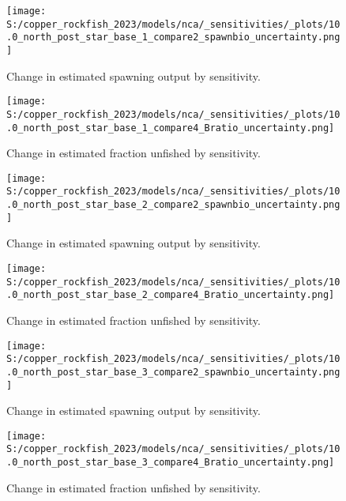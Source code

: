 \documentclass[11pt,
  letterpaper,
]{article}
\begin{document}
\newpage

\begin{figure}
{\centering
\texttt{[image: S:/copper\_rockfish\_2023/models/nca/\_sensitivities/\_plots/10.0\_north\_post\_star\_base\_1\_compare2\_spawnbio\_uncertainty.png]}
}
\caption{Change in estimated spawning output by sensitivity.\label{fig:sens-ssb-1}}
\end{figure}

\newpage

\begin{figure}
{\centering
\texttt{[image: S:/copper\_rockfish\_2023/models/nca/\_sensitivities/\_plots/10.0\_north\_post\_star\_base\_1\_compare4\_Bratio\_uncertainty.png]}
}
\caption{Change in estimated fraction unfished by sensitivity.\label{fig:sens-depl-1}}
\end{figure}

\newpage

\begin{figure}
{\centering
\texttt{[image: S:/copper\_rockfish\_2023/models/nca/\_sensitivities/\_plots/10.0\_north\_post\_star\_base\_2\_compare2\_spawnbio\_uncertainty.png]}
}
\caption{Change in estimated spawning output by sensitivity.\label{fig:sens-ssb-2}}
\end{figure}

\newpage

\begin{figure}
{\centering
\texttt{[image: S:/copper\_rockfish\_2023/models/nca/\_sensitivities/\_plots/10.0\_north\_post\_star\_base\_2\_compare4\_Bratio\_uncertainty.png]}
}
\caption{Change in estimated fraction unfished by sensitivity.\label{fig:sens-depl-2}}
\end{figure}

\newpage

\begin{figure}
{\centering
\texttt{[image: S:/copper\_rockfish\_2023/models/nca/\_sensitivities/\_plots/10.0\_north\_post\_star\_base\_3\_compare2\_spawnbio\_uncertainty.png]}
}
\caption{Change in estimated spawning output by sensitivity.\label{fig:sens-ssb-3}}
\end{figure}

\newpage

\begin{figure}
{\centering
\texttt{[image: S:/copper\_rockfish\_2023/models/nca/\_sensitivities/\_plots/10.0\_north\_post\_star\_base\_3\_compare4\_Bratio\_uncertainty.png]}
}
\caption{Change in estimated fraction unfished by sensitivity.\label{fig:sens-depl-3}}
\end{figure}
\end{document}
